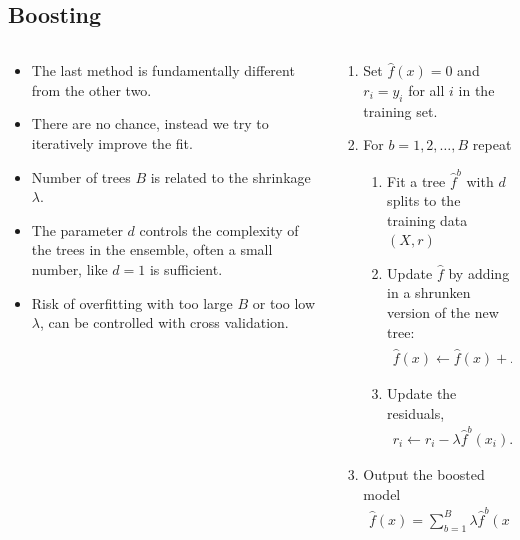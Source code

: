\documentclass[aspectratio=169,10pt]{beamer}
\begin{document}
\subsection{Boosting}
\begin{frame}{\secname}{\subsecname}
  
  \begin{columns}
    \begin{column}{.5\textwidth}
      \begin{itemize}
        \item The last method is fundamentally different from the other two.
        \item There are no chance, instead we try to iteratively improve the fit.
        \item Number of trees $B$ is related to the shrinkage $\lambda$.
        \item The parameter $d$ controls the complexity of the trees in the ensemble, often a small number, like $d=1$ is sufficient.
        \item Risk of overfitting with too large $B$ or too low $\lambda$, can be controlled with cross validation.
      \end{itemize}
    \end{column}
    \begin{column}{.5\textwidth}
      \begingroup
      \footnotesize
      \begin{enumerate}
        \item Set $\hat{f}(x) = 0$ and $r_i = y_i$ for all $i$ in the training set. 
        \item For $b = 1,2, \ldots, B$ repeat
        \begin{enumerate}
          \begingroup
          \footnotesize
          \item Fit a tree $\hat{f}^b$ with $d$ splits to the training data $(X, r)$
          \item Update $\hat{f}$ by adding in a shrunken version of the new tree: 
          \begin{align*}
              \hat{f}(x) \leftarrow \hat{f}(x) + \lambda \hat{f}^b(x). 
          \end{align*}
          \item Update the residuals, 
          \begin{align*}
              r_i \leftarrow r_i - \lambda \hat{f}^b(x_i). 
          \end{align*}
          \endgroup
        \end{enumerate}
        \item Output the boosted model
        \begin{align*}
            \hat{f}(x) = \sum_{b=1}^B \lambda \hat{f}^b(x)
        \end{align*}
      \end{enumerate}
      \endgroup
    \end{column}
  \end{columns}
\end{frame}
\end{document}
